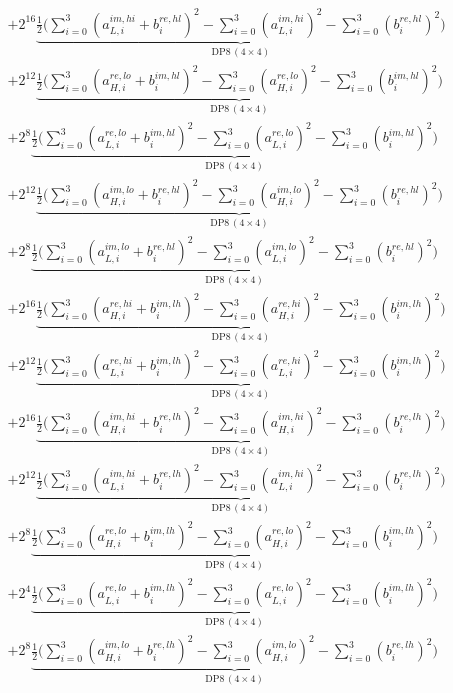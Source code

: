 \documentclass[fleqn]{article}
\newcommand{\DPop}[3]{\mathrm{DP#1}\,(#2\!\times\!#3)}
\begin{document}
\begin{align*}
  & + 2^{16}\underbrace{\tfrac{1}{2}\Big(\sum_{i=0}^{3}(a_{L,i}^{im,hi}{+}b_i^{re,hl})^2 - \sum_{i=0}^{3}(a_{L,i}^{im,hi})^2 - \sum_{i=0}^{3}(b_i^{re,hl})^2\Big)}_{\DPop{8}{4}{4}} \\[0.5em]
  & + 2^{12}\underbrace{\tfrac{1}{2}\Big(\sum_{i=0}^{3}(a_{H,i}^{re,lo}{+}b_i^{im,hl})^2 - \sum_{i=0}^{3}(a_{H,i}^{re,lo})^2 - \sum_{i=0}^{3}(b_i^{im,hl})^2\Big)}_{\DPop{8}{4}{4}} \\[0.5em]
  & + 2^{8}\underbrace{\tfrac{1}{2}\Big(\sum_{i=0}^{3}(a_{L,i}^{re,lo}{+}b_i^{im,hl})^2 - \sum_{i=0}^{3}(a_{L,i}^{re,lo})^2 - \sum_{i=0}^{3}(b_i^{im,hl})^2\Big)}_{\DPop{8}{4}{4}} \\[0.5em]
  & + 2^{12}\underbrace{\tfrac{1}{2}\Big(\sum_{i=0}^{3}(a_{H,i}^{im,lo}{+}b_i^{re,hl})^2 - \sum_{i=0}^{3}(a_{H,i}^{im,lo})^2 - \sum_{i=0}^{3}(b_i^{re,hl})^2\Big)}_{\DPop{8}{4}{4}} \\[0.5em]
  & + 2^{8}\underbrace{\tfrac{1}{2}\Big(\sum_{i=0}^{3}(a_{L,i}^{im,lo}{+}b_i^{re,hl})^2 - \sum_{i=0}^{3}(a_{L,i}^{im,lo})^2 - \sum_{i=0}^{3}(b_i^{re,hl})^2\Big)}_{\DPop{8}{4}{4}} \\[0.5em]
  & + 2^{16}\underbrace{\tfrac{1}{2}\Big(\sum_{i=0}^{3}(a_{H,i}^{re,hi}{+}b_i^{im,lh})^2 - \sum_{i=0}^{3}(a_{H,i}^{re,hi})^2 - \sum_{i=0}^{3}(b_i^{im,lh})^2\Big)}_{\DPop{8}{4}{4}} \\[0.5em]
  & + 2^{12}\underbrace{\tfrac{1}{2}\Big(\sum_{i=0}^{3}(a_{L,i}^{re,hi}{+}b_i^{im,lh})^2 - \sum_{i=0}^{3}(a_{L,i}^{re,hi})^2 - \sum_{i=0}^{3}(b_i^{im,lh})^2\Big)}_{\DPop{8}{4}{4}} \\[0.5em]
  & + 2^{16}\underbrace{\tfrac{1}{2}\Big(\sum_{i=0}^{3}(a_{H,i}^{im,hi}{+}b_i^{re,lh})^2 - \sum_{i=0}^{3}(a_{H,i}^{im,hi})^2 - \sum_{i=0}^{3}(b_i^{re,lh})^2\Big)}_{\DPop{8}{4}{4}} \\[0.5em]
  & + 2^{12}\underbrace{\tfrac{1}{2}\Big(\sum_{i=0}^{3}(a_{L,i}^{im,hi}{+}b_i^{re,lh})^2 - \sum_{i=0}^{3}(a_{L,i}^{im,hi})^2 - \sum_{i=0}^{3}(b_i^{re,lh})^2\Big)}_{\DPop{8}{4}{4}} \\[0.5em]
  & + 2^{8}\underbrace{\tfrac{1}{2}\Big(\sum_{i=0}^{3}(a_{H,i}^{re,lo}{+}b_i^{im,lh})^2 - \sum_{i=0}^{3}(a_{H,i}^{re,lo})^2 - \sum_{i=0}^{3}(b_i^{im,lh})^2\Big)}_{\DPop{8}{4}{4}} \\[0.5em]
  & + 2^{4}\underbrace{\tfrac{1}{2}\Big(\sum_{i=0}^{3}(a_{L,i}^{re,lo}{+}b_i^{im,lh})^2 - \sum_{i=0}^{3}(a_{L,i}^{re,lo})^2 - \sum_{i=0}^{3}(b_i^{im,lh})^2\Big)}_{\DPop{8}{4}{4}} \\[0.5em]
  & + 2^{8}\underbrace{\tfrac{1}{2}\Big(\sum_{i=0}^{3}(a_{H,i}^{im,lo}{+}b_i^{re,lh})^2 - \sum_{i=0}^{3}(a_{H,i}^{im,lo})^2 - \sum_{i=0}^{3}(b_i^{re,lh})^2\Big)}_{\DPop{8}{4}{4}} \\[0.5em]

\end{align*}
\end{document}
